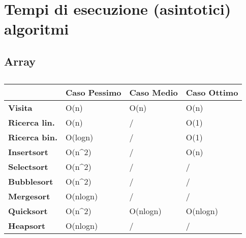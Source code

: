 \documentclass[10pt]{article}
\begin{document}
\section{Tempi di esecuzione (asintotici) algoritmi}

\subsection{Array}          
\begin{table}[H]
\begin{tabular}{|l|l|l|l|}
\hline
\textbf{}             & \textbf{Caso Pessimo}   & \textbf{Caso Medio} & \textbf{Caso Ottimo} \\ \hline
\textbf{Visita}       & O(n)                    & O(n)                & O(n)                 \\ \hline
\textbf{Ricerca lin.} & O(n)                    & /                   & O(1)                 \\ \hline
\textbf{Ricerca bin.} & O(logn)                 & /                   & O(1)                 \\ \hline
\textbf{Insertsort}   & O(n\textasciicircum{}2) & /                   & O(n)                 \\ \hline
\textbf{Selectsort}   & O(n\textasciicircum{}2) & /                   & /                    \\ \hline
\textbf{Bubblesort}   & O(n\textasciicircum{}2) & /                   & /                    \\ \hline
\textbf{Mergesort}    & O(nlogn)                & /                   & /                    \\ \hline
\textbf{Quicksort}    & O(n\textasciicircum{}2) & O(nlogn)            & O(nlogn)             \\ \hline
\textbf{Heapsort}     & O(nlogn)                & /                   & /                    \\ \hline
\end{tabular}
\caption{}
\label{tab:my-table}
\end{table}
\end{document}
